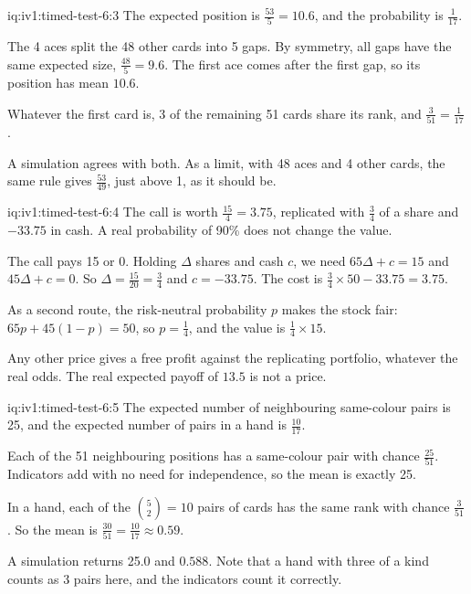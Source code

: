 \begin{solution}{iq:iv1:timed-test-6:3}
The expected position is $\frac{53}{5} = 10.6$, and the probability is $\frac{1}{17}$.

The 4 aces split the 48 other cards into 5 gaps. By symmetry, all gaps have the same expected size, $\frac{48}{5} = 9.6$. The first ace comes after the first gap, so its position has mean $10.6$.

Whatever the first card is, 3 of the remaining 51 cards share its rank, and $\frac{3}{51} = \frac{1}{17}$.

A simulation agrees with both. As a limit, with 48 aces and 4 other cards, the same rule gives $\frac{53}{49}$, just above 1, as it should be.

\end{solution}

\begin{solution}{iq:iv1:timed-test-6:4}
The call is worth $\frac{15}{4} = 3.75$, replicated with $\frac34$ of a share and $-33.75$ in cash. A real probability of 90\% does not change the value.

The call pays 15 or 0. Holding $\Delta$ shares and cash $c$, we need $65\Delta + c = 15$ and $45\Delta + c = 0$. So $\Delta = \frac{15}{20} = \frac34$ and $c = -33.75$. The cost is $\frac34 \times 50 - 33.75 = 3.75$.

As a second route, the risk-neutral probability $p$ makes the stock fair: $65p + 45(1 - p) = 50$, so $p = \frac14$, and the value is $\frac14 \times 15$.

Any other price gives a free profit against the replicating portfolio, whatever the real odds. The real expected payoff of $13.5$ is not a price.

\end{solution}

\begin{solution}{iq:iv1:timed-test-6:5}
The expected number of neighbouring same-colour pairs is 25, and the expected number of pairs in a hand is $\frac{10}{17}$.

Each of the 51 neighbouring positions has a same-colour pair with chance $\frac{25}{51}$. Indicators add with no need for independence, so the mean is exactly 25.

In a hand, each of the $\binom52 = 10$ pairs of cards has the same rank with chance $\frac{3}{51}$. So the mean is $\frac{30}{51} = \frac{10}{17} \approx 0.59$.

A simulation returns 25.0 and $0.588$. Note that a hand with three of a kind counts as 3 pairs here, and the indicators count it correctly.

\end{solution}

